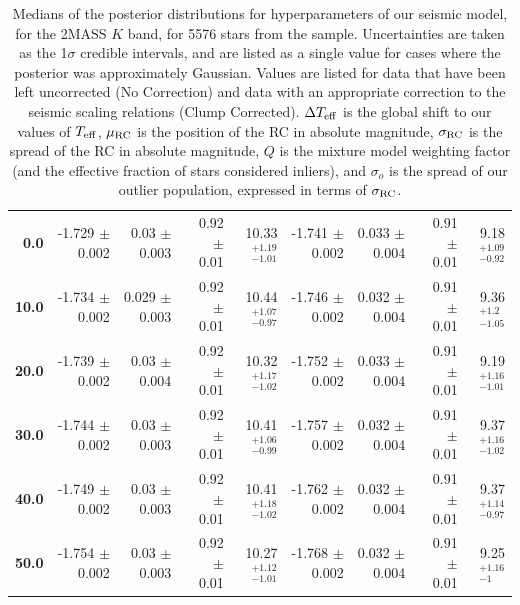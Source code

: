 \documentclass[fleqn,usenatbib]{mnras}
\newcommand{\murc}{\mbox{$\mu_{\rm RC}$}\xspace}
\newcommand{\sigrc}{\mbox{$\sigma_{\rm RC}$}\xspace}
\newcommand{\nstars}{5576 \xspace} %
\newcommand{\teff}{\mbox{$T_{\rm eff}$}\xspace}
\begin{document}
\begin{table}
\begin{tabular}{rrrrr|rrrr}
        \textbf{0.0  } & -1.729 $\pm$ 0.002 &   0.03 $\pm$ 0.003 &  0.92 $\pm$ 0.01 &  10.33$_{-1.01}^{+1.19}$    & -1.741 $\pm$ 0.002 &   0.033 $\pm$ 0.004 &  0.91 $\pm$ 0.01 &   9.18$_{-0.92}^{+1.09}$ \\
        \textbf{10.0 } & -1.734 $\pm$ 0.002 &  0.029 $\pm$ 0.003 &  0.92 $\pm$ 0.01 &  10.44$_{-0.97}^{+1.07}$    & -1.746 $\pm$ 0.002 &   0.032 $\pm$ 0.004 &  0.91 $\pm$ 0.01 &   9.36$_{-1.05}^{+ 1.2}$\\
        \textbf{20.0 } & -1.739 $\pm$ 0.002 &   0.03 $\pm$ 0.004 &  0.92 $\pm$ 0.01 &  10.32$_{-1.02}^{+1.17}$    & -1.752 $\pm$ 0.002 &   0.033 $\pm$ 0.004 &  0.91 $\pm$ 0.01 &   9.19$_{-1.01}^{+1.16}$ \\
        \textbf{30.0 } & -1.744 $\pm$ 0.002 &   0.03 $\pm$ 0.003 &  0.92 $\pm$ 0.01 &  10.41$_{-0.99}^{+1.06}$    & -1.757 $\pm$ 0.002 &   0.032 $\pm$ 0.004 &  0.91 $\pm$ 0.01 &   9.37$_{-1.02}^{+1.16}$\\
        \textbf{40.0 } & -1.749 $\pm$ 0.002 &   0.03 $\pm$ 0.003 &  0.92 $\pm$ 0.01 &  10.41$_{-1.02}^{+1.18}$    & -1.762 $\pm$ 0.002 &   0.032 $\pm$ 0.004 &  0.91 $\pm$ 0.01 &   9.37$_{-0.97}^{+1.14}$ \\
        \textbf{50.0 } & -1.754 $\pm$ 0.002 &   0.03 $\pm$ 0.003 &  0.92 $\pm$ 0.01 &  10.27$_{-1.01}^{+1.12}$    & -1.768 $\pm$ 0.002 &   0.032 $\pm$ 0.004 &  0.91 $\pm$ 0.01 &   9.25$_{-1   }^{+1.16}$ \\
    \bottomrule
    \end{tabular}
\caption{Medians of the posterior distributions for hyperparameters of our seismic model, for the 2MASS $K$ band, for \nstars stars from the  sample. Uncertainties are taken as the 1$\sigma$ credible intervals, and are listed as a single value for cases where the posterior was approximately Gaussian. Values are listed for data that have been left uncorrected (No Correction) and data with an appropriate correction to the seismic scaling relations (Clump Corrected). $\Delta\teff$ is the global shift to our values of \teff, \murc is the position of the RC in absolute magnitude, \sigrc is the spread of the RC in absolute magnitude, $Q$ is the mixture model weighting factor (and the effective fraction of stars considered inliers), and $\sigma_o$ is the spread of our outlier population, expressed in terms of \sigrc.}
\label{tab:yu_k}
\end{table}
\end{document}
